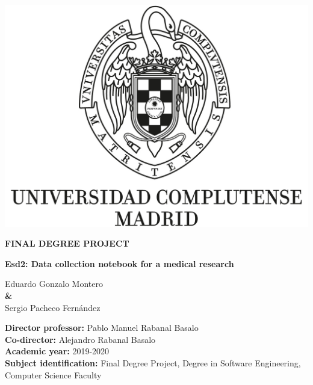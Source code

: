 \documentclass{report}
\begin{document}
\begin{titlepage}
        \clearpage
        
        \pagestyle{empty}
 
        \centering
        {\includegraphics[width=1\textwidth]{images/logo_UCM}}
    
        \vspace{1cm}
        
        {\huge\textbf{FINAL DEGREE PROJECT \\ }  }

        \vspace{0.5cm}
        
        {\huge\textbf{Esd2: Data collection notebook for a medical research}}
        
        \vspace{1.4cm}
    
        {\Large Eduardo Gonzalo Montero \\}
        \vspace{0.5cm}
        {\textbf \&\\}
        \vspace{0.5cm}
        {\Large Sergio Pacheco Fernández \\}
        
        \vspace{1.4cm}
        
        \raggedright
        {\Large \textbf{Director professor:} Pablo Manuel Rabanal Basalo \\}
        \vspace{0.1cm}
         {\Large \textbf{Co-director:} Alejandro Rabanal Basalo \\}
        \vspace{0.1cm}
        {\Large\textbf {Academic year:} 2019-2020 \\}
        \vspace{0.1cm}
        {\Large\textbf {Subject identification: }Final Degree Project, Degree in Software Engineering, Computer Science Faculty\\}
    
        \clearpage
     \end{titlepage}
\end{document}
